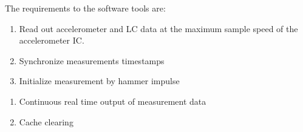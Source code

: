 The requirements to the software tools are:
\begin{enumerate}[label=m\arabic*]
    \item Read out accelerometer and \ac{LC} data at the maximum sample speed of the accelerometer \ac{IC}.
    \item Synchronize measurements timestamps
    \item Initialize measurement by hammer impulse
\end{enumerate}
    
\begin{enumerate}[label=w\arabic]
    \item Continuous real time output of measurement data
    \item Cache clearing
\end{enumerate}
